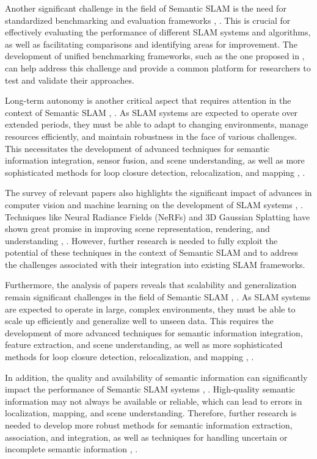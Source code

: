 \documentclass[conference]{IEEEtran}
\begin{document}
Another significant challenge in the field of Semantic SLAM is the need for standardized benchmarking and evaluation frameworks \cite{b2}, \cite{b6}. This is crucial for effectively evaluating the performance of different SLAM systems and algorithms, as well as facilitating comparisons and identifying areas for improvement. The development of unified benchmarking frameworks, such as the one proposed in \cite{b2}, can help address this challenge and provide a common platform for researchers to test and validate their approaches.

Long-term autonomy is another critical aspect that requires attention in the context of Semantic SLAM \cite{b7}, \cite{b8}. As SLAM systems are expected to operate over extended periods, they must be able to adapt to changing environments, manage resources efficiently, and maintain robustness in the face of various challenges. This necessitates the development of advanced techniques for semantic information integration, sensor fusion, and scene understanding, as well as more sophisticated methods for loop closure detection, relocalization, and mapping \cite{b9}, \cite{b10}.

The survey of relevant papers also highlights the significant impact of advances in computer vision and machine learning on the development of SLAM systems \cite{b11}, \cite{b12}. Techniques like Neural Radiance Fields (NeRFs) and 3D Gaussian Splatting have shown great promise in improving scene representation, rendering, and understanding \cite{b13}, \cite{b14}. However, further research is needed to fully exploit the potential of these techniques in the context of Semantic SLAM and to address the challenges associated with their integration into existing SLAM frameworks.

Furthermore, the analysis of papers reveals that scalability and generalization remain significant challenges in the field of Semantic SLAM \cite{b15}, \cite{b16}. As SLAM systems are expected to operate in large, complex environments, they must be able to scale up efficiently and generalize well to unseen data. This requires the development of more advanced techniques for semantic information integration, feature extraction, and scene understanding, as well as more sophisticated methods for loop closure detection, relocalization, and mapping \cite{b17}, \cite{b18}.

In addition, the quality and availability of semantic information can significantly impact the performance of Semantic SLAM systems \cite{b19}, \cite{b20}. High-quality semantic information may not always be available or reliable, which can lead to errors in localization, mapping, and scene understanding. Therefore, further research is needed to develop more robust methods for semantic information extraction, association, and integration, as well as techniques for handling uncertain or incomplete semantic information \cite{b21}, \cite{b22}.
\end{document}
